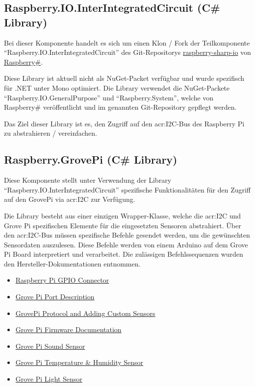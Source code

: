 \subsection{Raspberry.IO.InterIntegratedCircuit (C\# Library)}
Bei dieser Komponente handelt es sich um einen Klon / Fork der Teilkomponente "`Raspberry.IO.InterIntegratedCircuit"' des Git-Repositorys \hyperlink{https://github.com/raspberry-sharp/raspberry-sharp-io/tree/master/Raspberry.IO.InterIntegratedCircuit}{raspberry-sharp-io} von \hyperlink{https://github.com/raspberry-sharp}{Raspberry\#}.

Diese Library ist aktuell nicht als NuGet-Packet verfügbar und wurde spezifisch für .NET unter Mono optimiert. Die Library verwendet die NuGet-Packete "`Raspberry.IO.GeneralPurpose"' und "`Raspberry.System"', welche von Raspberry\# veröffentlicht und im genannten Git-Repository gepflegt werden.

Das Ziel dieser Library ist es, den Zugriff auf den \gls{acr:I2C}-Bus des Raspberry Pi zu abstrahieren / vereinfachen.

\subsection{Raspberry.GrovePi (C\# Library)}
Diese Komponente stellt unter Verwendung der Library "`Raspberry.IO.InterIntegratedCircuit"' spezifische Funktionalitäten für den Zugriff auf den GrovePi via \gls{acr:I2C} zur Verfügung.

Die Library besteht aus einer einzigen Wrapper-Klasse, welche die \gls{acr:I2C} und Grove Pi spezifischen Elemente für die eingesetzten Sensoren abstrahiert. Über den \gls{acr:I2C}-Bus müssen spezifische Befehle gesendet werden, um die gewünschten Sensordaten auszulesen. Diese Befehle werden von einem Arduino auf dem Grove Pi Board interpretiert und verarbeitet. Die zulässigen Befehlssequenzen wurden den Hersteller-Dokumentationen entnommen.

\begin{itemize}
\item \hyperlink{https://learn.adafruit.com/adafruits-raspberry-pi-lesson-4-gpio-setup/the-gpio-connector}{Raspberry Pi GPIO Connector}
\item \hyperlink{http://www.dexterindustries.com/GrovePi/engineering/port-description/}{Grove Pi Port Description}
\item \hyperlink{http://www.dexterindustries.com/GrovePi/programming/grovepi-protocol-adding-custom-sensors/}{GrovePi Protocol and Adding Custom Sensors}
\item \hyperlink{https://github.com/DexterInd/GrovePi/blob/bfcaa57bb6ce2b5c4cb0057569ea38f3574f24cf/Firmware/Source/v1.2/grove_pi_v1_2_6/README.md}{Grove Pi Firmware Documentation}
\item \hyperlink{http://www.seeedstudio.com/wiki/Grove_-_Sound_Sensor}{Grove Pi Sound Sensor}
\item \hyperlink{http://www.seeedstudio.com/wiki/Grove_-_Temperature_and_Humidity_Sensor}{Grove Pi Temperature \& Humidity Sensor}
\item \hyperlink{http://www.seeedstudio.com/wiki/Grove_-_Light_Sensor}{Grove Pi Light Sensor}
\end{itemize}



